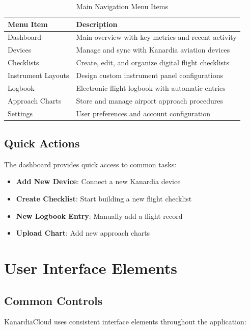 \begin{table}[H]
\centering
\begin{tabular}{@{}lp{8cm}@{}}
\toprule
\textbf{Menu Item} & \textbf{Description} \\
\midrule
Dashboard & Main overview with key metrics and recent activity \\
Devices & Manage and sync with Kanardia aviation devices \\
Checklists & Create, edit, and organize digital flight checklists \\
Instrument Layouts & Design custom instrument panel configurations \\
Logbook & Electronic flight logbook with automatic entries \\
Approach Charts & Store and manage airport approach procedures \\
Settings & User preferences and account configuration \\
\bottomrule
\end{tabular}
\caption{Main Navigation Menu Items}
\label{tab:navigation_menu}
\end{table}

\subsection{Quick Actions}

The dashboard provides quick access to common tasks:

\begin{itemize}
    \item \textbf{Add New Device}: Connect a new Kanardia device
    \item \textbf{Create Checklist}: Start building a new flight checklist
    \item \textbf{New Logbook Entry}: Manually add a flight record
    \item \textbf{Upload Chart}: Add new approach charts
\end{itemize}

\section{User Interface Elements}

\subsection{Common Controls}

KanardiaCloud uses consistent interface elements throughout the application:

